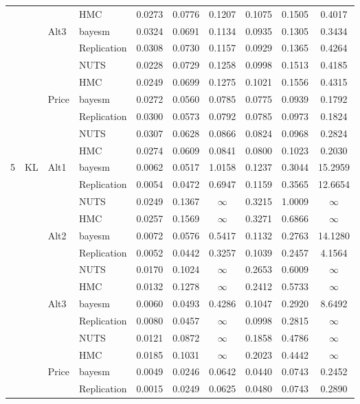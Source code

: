 \begin{longtable}{clllcccccc}
 &  &  & HMC & 0.0273 & 0.0776 & 0.1207 & 0.1075 & 0.1505 & 0.4017 \\
 &  & Alt3 & bayesm & 0.0324 & 0.0691 & 0.1134 & 0.0935 & 0.1305 & 0.3434 \\
 &  &  & Replication & 0.0308 & 0.0730 & 0.1157 & 0.0929 & 0.1365 & 0.4264 \\
 &  &  & NUTS & 0.0228 & 0.0729 & 0.1258 & 0.0998 & 0.1513 & 0.4185 \\
 &  &  & HMC & 0.0249 & 0.0699 & 0.1275 & 0.1021 & 0.1556 & 0.4315 \\
 &  & Price & bayesm & 0.0272 & 0.0560 & 0.0785 & 0.0775 & 0.0939 & 0.1792 \\
 &  &  & Replication & 0.0300 & 0.0573 & 0.0792 & 0.0785 & 0.0973 & 0.1824 \\
 &  &  & NUTS & 0.0307 & 0.0628 & 0.0866 & 0.0824 & 0.0968 & 0.2824 \\
 &  &  & HMC & 0.0274 & 0.0609 & 0.0841 & 0.0800 & 0.1023 & 0.2030 \\
5 & KL & Alt1 & bayesm & 0.0062 & 0.0517 & 1.0158 & 0.1237 & 0.3044 & 15.2959 \\
 &  &  & Replication & 0.0054 & 0.0472 & 0.6947 & 0.1159 & 0.3565 & 12.6654 \\
 &  &  & NUTS & 0.0249 & 0.1367 & $\infty$ & 0.3215 & 1.0009 & $\infty$ \\
 &  &  & HMC & 0.0257 & 0.1569 & $\infty$ & 0.3271 & 0.6866 & $\infty$ \\
 &  & Alt2 & bayesm & 0.0072 & 0.0576 & 0.5417 & 0.1132 & 0.2763 & 14.1280 \\
 &  &  & Replication & 0.0052 & 0.0442 & 0.3257 & 0.1039 & 0.2457 & 4.1564 \\
 &  &  & NUTS & 0.0170 & 0.1024 & $\infty$ & 0.2653 & 0.6009 & $\infty$ \\
 &  &  & HMC & 0.0132 & 0.1278 & $\infty$ & 0.2412 & 0.5733 & $\infty$ \\
 &  & Alt3 & bayesm & 0.0060 & 0.0493 & 0.4286 & 0.1047 & 0.2920 & 8.6492 \\
 &  &  & Replication & 0.0080 & 0.0457 & $\infty$ & 0.0998 & 0.2815 & $\infty$ \\
 &  &  & NUTS & 0.0121 & 0.0872 & $\infty$ & 0.1858 & 0.4786 & $\infty$ \\
 &  &  & HMC & 0.0185 & 0.1031 & $\infty$ & 0.2023 & 0.4442 & $\infty$ \\
 &  & Price & bayesm & 0.0049 & 0.0246 & 0.0642 & 0.0440 & 0.0743 & 0.2452 \\
 &  &  & Replication & 0.0015 & 0.0249 & 0.0625 & 0.0480 & 0.0743 & 0.2890 \\

\end{longtable}
